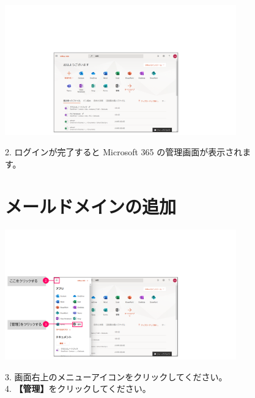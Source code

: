 \begin{figure}[h]
    \begin{minipage}{0.6\textwidth}
        \vspace{-1.5cm}
        \includegraphics[width=10cm]{figures/M365_setting1-01.png}
    \end{minipage}
    \begin{minipage}{0.4\textwidth}
        2. ログインが完了すると Microsoft 365 の管理画面が表示されます。
    \end{minipage}
    \vspace{4cm}
\end{figure}

\begin{figure}[h]
    \section{メールドメインの追加}
    \label{sec:メールドメインの追加}
\end{figure}

\begin{figure}[h]
    \begin{minipage}{0.6\textwidth}
        \vspace{-1.0cm}
        \includegraphics[width=10cm]{figures/M365_setting1-02.png}
    \end{minipage}
    \begin{minipage}{0.4\textwidth}
        3. 画面右上のメニューアイコンをクリックしてください。\\
        4. \textbf{【管理】}をクリックしてください。
    \end{minipage}
\end{figure}

